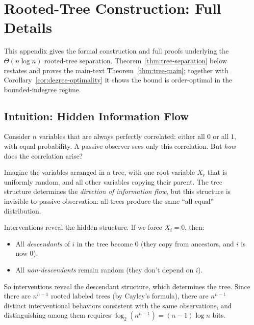 \documentclass{article}
\theoremstyle{plain}
\theoremstyle{definition}
\begin{document}



\appendix

\section{Rooted-Tree Construction: Full Details}
\label{app:rooted-tree}

This appendix gives the formal construction and full proofs underlying the
$\Theta(n \log n)$ rooted-tree separation. Theorem~\ref{thm:tree-separation} below
restates and proves the main-text Theorem~\ref{thm:tree-main}; together with
Corollary~\ref{cor:degree-optimality} it shows the bound is order-optimal in
the bounded-indegree regime.

\subsection*{Intuition: Hidden Information Flow}

Consider $n$ variables that are always perfectly correlated: either all $0$ or all $1$, with equal probability. A passive observer sees only this correlation. But \emph{how} does the correlation arise?

Imagine the variables arranged in a tree, with one root variable $X_r$ that is uniformly random, and all other variables copying their parent. The tree structure determines the \emph{direction of information flow}, but this structure is invisible to passive observation: all trees produce the same ``all equal'' distribution.

Interventions reveal the hidden structure. If we force $X_i = 0$, then:
\begin{itemize}
    \item All \emph{descendants} of $i$ in the tree become $0$ (they copy from ancestors, and $i$ is now $0$).
    \item All \emph{non-descendants} remain random (they don't depend on $i$).
\end{itemize}

So interventions reveal the descendant structure, which determines the tree. Since there are $n^{n-1}$ rooted labeled trees (by Cayley's formula), there are $n^{n-1}$ distinct interventional behaviors consistent with the same observations, and distinguishing among them requires $\log_2(n^{n-1}) = (n-1) \log n$ bits.
\end{document}
